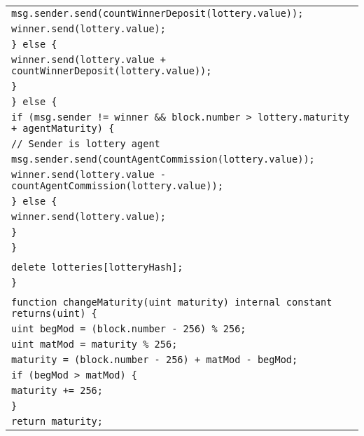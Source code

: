 \documentclass[a4paper]{article}
\begin{document}
\begin{tabularx}{\linewidth}{l}
        \qquad\qquad\qquad\qquad\texttt{msg.sender.send(countWinnerDeposit(lottery.value));}\\
        \qquad\qquad\qquad\qquad\texttt{winner.send(lottery.value);}\\
        \qquad\qquad\qquad\texttt{\} else \{}\\
        \qquad\qquad\qquad\qquad\texttt{winner.send(lottery.value + countWinnerDeposit(lottery.value));}\\
        \qquad\qquad\qquad\texttt{\}}\\
        \qquad\qquad\texttt{\} else \{}\\
        \qquad\qquad\qquad\texttt{if (msg.sender != winner \&\& block.number > lottery.maturity + agentMaturity) \{}\\
        \qquad\qquad\qquad\qquad\texttt{// Sender is~lottery agent}\\
        \qquad\qquad\qquad\qquad\texttt{msg.sender.send(countAgentCommission(lottery.value));}\\
        \qquad\qquad\qquad\qquad\texttt{winner.send(lottery.value - countAgentCommission(lottery.value));}\\
        \qquad\qquad\qquad\texttt{\} else \{}\\
        \qquad\qquad\qquad\qquad\texttt{winner.send(lottery.value);}\\
        \qquad\qquad\qquad\texttt{\}}\\
        \qquad\qquad\texttt{\}}\\
        \\
        \qquad\qquad\texttt{delete lotteries[lotteryHash];}\\
        \qquad\texttt{\}}\\
        \\
        \qquad\texttt{function changeMaturity(uint maturity) internal constant returns(uint) \{}\\
        \qquad\qquad\texttt{uint begMod = (block.number - 256) \% 256;}\\
        \qquad\qquad\texttt{uint matMod = maturity \% 256;}\\
        \qquad\qquad\texttt{maturity = (block.number - 256) + matMod - begMod;}\\
        \qquad\qquad\texttt{if (begMod > matMod) \{}\\
        \qquad\qquad\qquad\texttt{maturity += 256;}\\
        \qquad\qquad\texttt{\}}\\
        \qquad\qquad\texttt{return maturity;}\\

\end{tabularx}
\end{document}
